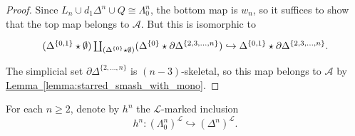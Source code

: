 \documentclass[main.tex]{subfiles}
\begin{document}
\begin{proof}
  Since $L_{n} \cup d_{1} \Delta^{n} \cup Q \cong \Lambda^{n}_{0}$, the bottom map is $w_{n}$, so it suffices to show that the top map belongs to $\mathcal{A}$. But this is isomorphic to
  \begin{equation*}
    \begin{tikzcd}
      (\Delta^{\{0, 1\}} \star \emptyset) \coprod_{(\Delta^{\{0\}} \star \emptyset)} (\Delta^{\{0\}} \star \partial \Delta^{\{2, 3, \ldots, n\}}) \hookrightarrow \Delta^{\{0, 1\}} \star \partial \Delta^{\{2, 3, \ldots, n\}}.
    \end{tikzcd}
  \end{equation*}
  The simplicial set $\partial \Delta^{\{2, \ldots, n\}}$ is $(n-3)$-skeletal, so this map belongs to $\mathcal{A}$ by \hyperref[lemma:starred_smash_with_mono]{Lemma~\ref*{lemma:starred_smash_with_mono}}.
\end{proof}

For each $n \geq 2$, denote by $h^{n}$ the $\mathcal{L}$-marked inclusion
\begin{equation*}
  h^{n}\colon (\Lambda^{n}_{0})^{\mathcal{L}} \hookrightarrow (\Delta^{n})^{\mathcal{L}}.
\end{equation*}
\end{document}
